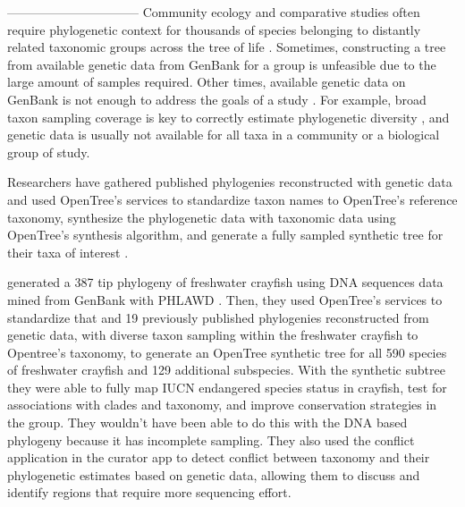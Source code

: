 \documentclass[oupdraft]{sysbio_sse}
\begin{document}
--------------------------------
Community ecology and comparative studies often require phylogenetic context for thousands of
species belonging to distantly related taxonomic groups across the tree of life \citep{}.
Sometimes, constructing a tree from available genetic data from GenBank for a group
is unfeasible due to the large amount of samples required.
Other times, available genetic data on GenBank is not enough to address the goals
of a study \citep{owen2015synthetic, brown2017development, ewers2019towards}.
For example, broad taxon sampling coverage is key to correctly estimate phylogenetic
diversity \citep{jantzen2019effects, park2018taxon}, and genetic data is usually
not available for all taxa in a community or a biological group of study.


Researchers have gathered published phylogenies reconstructed with genetic data
and used OpenTree's services to standardize taxon names to OpenTree's reference taxonomy,
synthesize the phylogenetic data with taxonomic data using OpenTree's synthesis algorithm,
and generate a fully sampled synthetic tree for their taxa of interest
\citep{owen2015synthetic, brown2017development, ewers2019towards}.

\citep{owen2015synthetic} generated a 387 tip phylogeny of freshwater crayfish using DNA sequences
data mined from GenBank with PHLAWD \citep{smith2009mega}. Then, they used OpenTree's services
 to standardize that and 19 previously published phylogenies
reconstructed from genetic data, with diverse taxon sampling within the freshwater crayfish
 to Opentree's taxonomy, to generate an OpenTree synthetic tree for all 590 species
of freshwater crayfish and 129 additional subspecies.
With the synthetic subtree they were able to fully map IUCN endangered species
status in crayfish, test for associations with clades and taxonomy, and improve conservation
strategies in the group. They wouldn't have been able to do this with the DNA based phylogeny
because it has incomplete sampling.
They also used the conflict application in the curator app to detect conflict between
taxonomy and their phylogenetic estimates based on genetic data, allowing them to
discuss and identify regions that require more sequencing effort.
\end{document}
